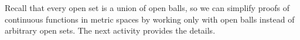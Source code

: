 \begin{comment}

\ActivitySolution

\ba
\item We assume that $f^{-1}(O)$ is an open set in $X$ whenever $O$ is an open set in $Y$. We need to show that for any $a \in X$, $f^{-1}(N)$ is a neighborhood of $a$ whenever $N$ is a neighborhood of $f(a)$. 

\item By definition of a neighborhood, there exists an $\epsilon > 0$ so that $B(f(a), \epsilon) \subseteq N$.

\item Now $B(f(a), \epsilon)$ is an open set in $Y$, so $f^{-1}(B(f(a), \epsilon))$ is an open set in $X$ by hypothesis.

\item  Every open set is a neighborhood of each of its points, and $a \in f^{-1}(B(f(a), \epsilon))$, so there exists $\delta > 0$ such that $B(a, \delta) \subseteq f^{-1}(B(f(a), \epsilon))$. Now $f(B(a, \delta)) \subseteq B(f(a), \epsilon) \subseteq N$, so $B(a, \delta) \subseteq f^{-1}(N)$. We conclude that $f^{-1}(N)$ is a neighborhood of $a$ and so $f$ is a continuous function. 

\ea

\end{comment}

Recall that every open set is a union of open balls, so we can simplify proofs of continuous functions in metric spaces by working only with open balls instead of arbitrary open sets. The next activity provides the details.

